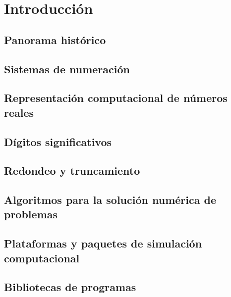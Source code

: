\chapter{Introducción}

\section{Panorama histórico}

\section{Sistemas de numeración}

\section{Representación computacional de números reales}

\section{Dígitos significativos}

\section{Redondeo y truncamiento}

\section{Algoritmos para la solución numérica de problemas}

\section{Plataformas y paquetes de simulación computacional}

\section{Bibliotecas de programas}